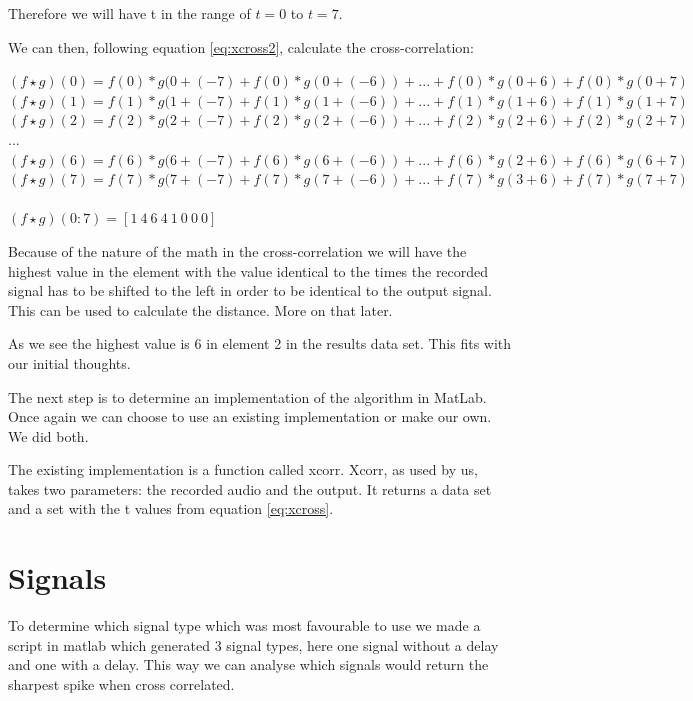 Therefore we will have t in the range of $t=0$ to $t=7$. 

We can then, following equation \ref{eq:xcross2}, calculate the cross-correlation:

\begin{center}
$(f\star g)(0)=f(0)*g(0+(-7)+f(0)*g(0+(-6))+...+f(0)*g(0+6)+f(0)*g(0+7)$\\
$(f\star g)(1)=f(1)*g(1+(-7)+f(1)*g(1+(-6))+...+f(1)*g(1+6)+f(1)*g(1+7)$\\
$(f\star g)(2)=f(2)*g(2+(-7)+f(2)*g(2+(-6))+...+f(2)*g(2+6)+f(2)*g(2+7)$\\
$...$\\
$(f\star g)(6)=f(6)*g(6+(-7)+f(6)*g(6+(-6))+...+f(6)*g(2+6)+f(6)*g(6+7)$\\
$(f\star g)(7)=f(7)*g(7+(-7)+f(7)*g(7+(-6))+...+f(7)*g(3+6)+f(7)*g(7+7)$\\
\ \\
$(f\star g)(0:7)=[1\ 4\ 6\ 4\ 1\ 0\ 0\ 0]$\\
\end{center}

Because of the nature of the math in the cross-correlation we will have the highest value in the element with the value identical to the times the recorded signal has to be shifted to the left in order to be identical to the output signal. This can be used to calculate the distance. More on that later.

As we see the highest value is 6 in element 2 in the results data set. This fits with our initial thoughts.

The next step is to determine an implementation of the algorithm in MatLab. Once again we can choose to use an existing implementation or make our own. We did both.

The existing implementation is a function called xcorr. Xcorr, as used by us, takes two parameters: the recorded audio and the output. It returns a data set and a set with the t values from equation \ref{eq:xcross}.

\section{Signals}
To determine which signal type which was most favourable to use we made a script in matlab which generated 3 signal types, here one signal without a delay and one with a delay. This way we can analyse which signals would return the sharpest spike when cross correlated.
